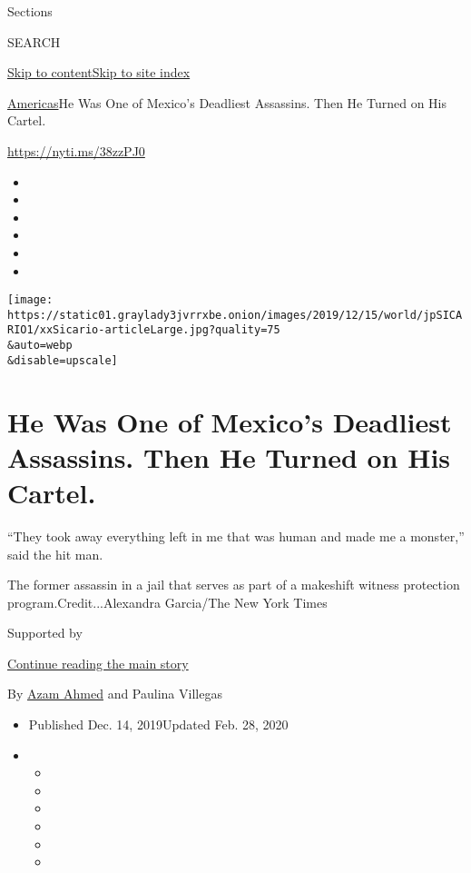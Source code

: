 Sections

SEARCH

\protect\hyperlink{site-content}{Skip to
content}\protect\hyperlink{site-index}{Skip to site index}

\href{/section/world/americas}{Americas}\textbar{}He Was One of Mexico's
Deadliest Assassins. Then He Turned on His Cartel.

\url{https://nyti.ms/38zzPJ0}

\begin{itemize}
\item
\item
\item
\item
\item
\item
\end{itemize}

\texttt{[image: https://static01.graylady3jvrrxbe.onion/images/2019/12/15/world/jpSICARIO1/xxSicario-articleLarge.jpg?quality=75\\\&auto=webp\\\&disable=upscale]}

\hypertarget{he-was-one-of-mexicos-deadliest-assassins-then-he-turned-on-his-cartel}{%
\section{He Was One of Mexico's Deadliest Assassins. Then He Turned on
His
Cartel.}\label{he-was-one-of-mexicos-deadliest-assassins-then-he-turned-on-his-cartel}}

``They took away everything left in me that was human and made me a
monster,'' said the hit man.

The former assassin in a jail that serves as part of a makeshift witness
protection program.Credit...Alexandra Garcia/The New York Times

Supported by

\protect\hyperlink{after-sponsor}{Continue reading the main story}

By \href{https://www.nytimes3xbfgragh.onion/by/azam-ahmed}{Azam Ahmed}
and Paulina Villegas

\begin{itemize}
\item
  Published Dec. 14, 2019Updated Feb. 28, 2020
\item
  \begin{itemize}
  \item
  \item
  \item
  \item
  \item
  \item
  \end{itemize}
\end{itemize}

